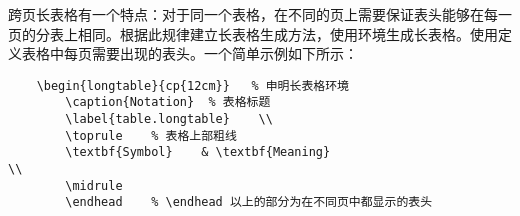 \documentclass{nitthesis}
\begin{document}
跨页长表格有一个特点：对于同一个表格，在不同的页上需要保证表头能够在每一页的分表上相同。根据此规律建立长表格生成方法，使用环境生成长表格。使用定义表格中每页需要出现的表头。一个简单示例如下所示：

\linespread{1}
\begin{lstlisting}
    \begin{longtable}{cp{12cm}}   % 申明长表格环境
        \caption{Notation}  % 表格标题
        \label{table.longtable}    \\
        \toprule    % 表格上部粗线
        \textbf{Symbol}    & \textbf{Meaning}                                                                             \\
        \midrule
        \endhead    % \endhead 以上的部分为在不同页中都显示的表头
        

\end{lstlisting}
\end{document}
